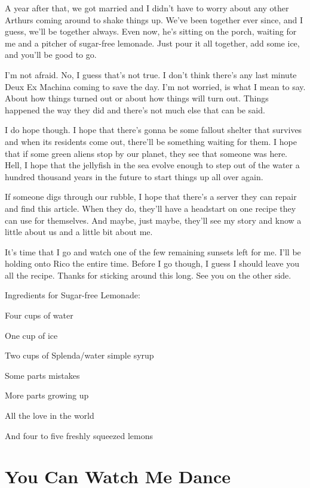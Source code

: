 A year after that, we got married and I didn't have to worry about any
other Arthurs coming around to shake things up. We've been together ever
since, and I guess, we'll be together always. Even now, he's sitting on
the porch, waiting for me and a pitcher of sugar-free lemonade. Just
pour it all together, add some ice, and you'll be good to go.

I'm not afraid. No, I guess that's not true. I don't think there's any
last minute Deux Ex Machina coming to save the day. I'm not worried, is
what I mean to say. About how things turned out or about how things will
turn out. Things happened the way they did and there's not much else
that can be said.

I do hope though. I hope that there's gonna be some fallout shelter that
survives and when its residents come out, there'll be something waiting
for them. I hope that if some green aliens stop by our planet, they see
that someone was here. Hell, I hope that the jellyfish in the sea evolve
enough to step out of the water a hundred thousand years in the future
to start things up all over again.

If someone digs through our rubble, I hope that there's a server they
can repair and find this article. When they do, they'll have a headstart
on one recipe they can use for themselves. And maybe, just maybe,
they'll see my story and know a little about us and a little bit about
me.

It's time that I go and watch one of the few remaining sunsets left for
me. I'll be holding onto Rico the entire time. Before I go though, I
guess I should leave you all the recipe. Thanks for sticking around this
long. See you on the other side.

Ingredients for Sugar-free Lemonade:

Four cups of water

One cup of ice

Two cups of Splenda/water simple syrup

Some parts mistakes

More parts growing up

All the love in the world

And four to five freshly squeezed lemons



\chapter*{You Can Watch Me Dance}

